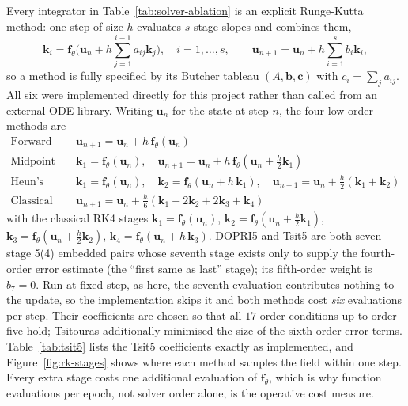 Every integrator in Table~\ref{tab:solver-ablation} is an explicit
Runge-Kutta method: one step of size $h$ evaluates $s$ stage slopes and
combines them,
\begin{equation}
\mathbf{k}_i=\mathbf{f}_\theta\Big(\mathbf{u}_n+h\sum_{j=1}^{i-1}a_{ij}\mathbf{k}_j\Big),\quad i=1,\dots,s,
\qquad
\mathbf{u}_{n+1}=\mathbf{u}_n+h\sum_{i=1}^{s}b_i\mathbf{k}_i,
\label{eq:rk-general}
\end{equation}
so a method is fully specified by its Butcher tableau $(A,\mathbf{b},\mathbf{c})$
with $c_i=\sum_j a_{ij}$. All six were implemented directly for this project rather than called
from an external ODE library. Writing $\mathbf{u}_n$ for the state at step $n$, the four
low-order methods are
\begin{align}
\text{Forward Euler (order 1):}\quad & \mathbf{u}_{n+1} = \mathbf{u}_n + h\, \mathbf{f}_\theta(\mathbf{u}_n) \label{eq:euler}\\
\text{Midpoint (order 2):}\quad & \mathbf{k}_1 = \mathbf{f}_\theta(\mathbf{u}_n), \quad
  \mathbf{u}_{n+1} = \mathbf{u}_n + h\,\mathbf{f}_\theta\!\left(\mathbf{u}_n + \tfrac{h}{2}\mathbf{k}_1\right) \label{eq:midpoint}\\
\text{Heun's method (order 2):}\quad & \mathbf{k}_1 = \mathbf{f}_\theta(\mathbf{u}_n), \quad
  \mathbf{k}_2 = \mathbf{f}_\theta(\mathbf{u}_n+h\,\mathbf{k}_1), \quad
  \mathbf{u}_{n+1} = \mathbf{u}_n + \tfrac{h}{2}(\mathbf{k}_1+\mathbf{k}_2) \label{eq:heun}\\
\text{Classical RK4 (order 4):}\quad & \mathbf{u}_{n+1} = \mathbf{u}_n + \tfrac{h}{6}\left(\mathbf{k}_1+2\mathbf{k}_2+2\mathbf{k}_3+\mathbf{k}_4\right) \label{eq:rk4}
\end{align}
with the classical RK4 stages $\mathbf{k}_1=\mathbf{f}_\theta(\mathbf{u}_n)$,
$\mathbf{k}_2=\mathbf{f}_\theta(\mathbf{u}_n+\tfrac{h}{2}\mathbf{k}_1)$,
$\mathbf{k}_3=\mathbf{f}_\theta(\mathbf{u}_n+\tfrac{h}{2}\mathbf{k}_2)$,
$\mathbf{k}_4=\mathbf{f}_\theta(\mathbf{u}_n+h\,\mathbf{k}_3)$. DOPRI5 and
Tsit5 are both seven-stage 5(4) embedded pairs whose seventh stage exists
only to supply the fourth-order error estimate (the ``first same as last''
stage); its fifth-order weight is $b_7=0$. Run at fixed step, as here, the
seventh evaluation contributes nothing to the update, so the implementation
skips it and both methods cost \emph{six} evaluations per step. Their
coefficients are chosen so that all $17$ order conditions up to order five
hold; Tsitouras \cite{tsitouras2011tsit5} additionally minimised the size of
the sixth-order error terms. Table~\ref{tab:tsit5} lists the Tsit5
coefficients exactly as implemented, and Figure~\ref{fig:rk-stages} shows
where each method samples the field within one step. Every extra stage costs
one additional evaluation of $\mathbf{f}_\theta$, which is why function
evaluations per epoch, not solver order alone, is the operative cost measure.

